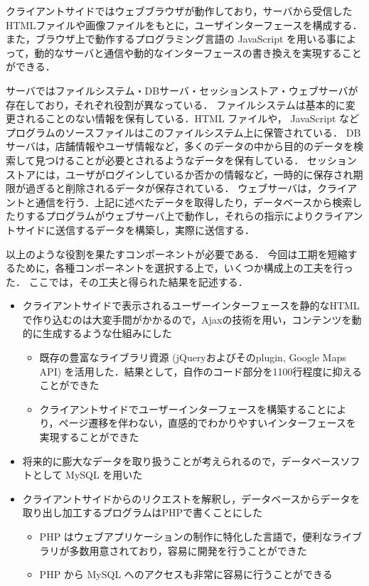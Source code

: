 \documentclass[a4paper]{jsarticle}
\begin{document}
クライアントサイドではウェブブラウザが動作しており，サーバから受信したHTMLファイルや画像ファイルをもとに，ユーザインターフェースを構成する．
また，ブラウザ上で動作するプログラミング言語の JavaScript を用いる事によって，動的なサーバと通信や動的なインターフェースの書き換えを実現することができる．

サーバではファイルシステム・DBサーバ・セッションストア・ウェブサーバが存在しており，それぞれ役割が異なっている．
ファイルシステムは基本的に変更されることのない情報を保有している．HTML ファイルや， JavaScript などプログラムのソースファイルはこのファイルシステム上に保管されている．
DBサーバは，店舗情報やユーザ情報など，多くのデータの中から目的のデータを検索して見つけることが必要とされるようなデータを保有している．
セッションストアには，ユーザがログインしているか否かの情報など，一時的に保存され期限が過ぎると削除されるデータが保存されている．
ウェブサーバは，クライアントと通信を行う．上記に述べたデータを取得したり，データベースから検索したりするプログラムがウェブサーバ上で動作し，それらの指示によりクライアントサイドに送信するデータを構築し，実際に送信する．

以上のような役割を果たすコンポーネントが必要である．
今回は工期を短縮するために，各種コンポーネントを選択する上で，いくつか構成上の工夫を行った．
ここでは，その工夫と得られた結果を記述する．
\begin{itemize}
\item クライアントサイドで表示されるユーザーインターフェースを静的なHTMLで作り込むのは大変手間がかかるので，Ajaxの技術を用い，コンテンツを動的に生成するような仕組みにした
  \begin{itemize}
  \item 既存の豊富なライブラリ資源 (jQueryおよびそのplugin, Google Maps API) を活用した．結果として，自作のコード部分を1100行程度に抑えることができた
  \item クライアントサイドでユーザーインターフェースを構築することにより，ページ遷移を伴わない，直感的でわかりやすいインターフェースを実現することができた
  \end{itemize}
\item 将来的に膨大なデータを取り扱うことが考えられるので，データベースソフトとして MySQL を用いた
\item クライアントサイドからのリクエストを解釈し，データベースからデータを取り出し加工するプログラムはPHPで書くことにした
  \begin{itemize}
  \item PHP はウェブアプリケーションの制作に特化した言語で，便利なライブラリが多数用意されており，容易に開発を行うことができた
  \item PHP から MySQL へのアクセスも非常に容易に行うことができる
  \end{itemize}
\end{itemize}
\end{document}
